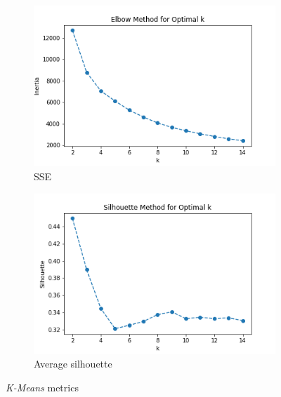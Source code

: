 \begin{figure}[h!]
     \captionsetup{justification=centering}		
     \centering
     \begin{subfigure}{0.49\textwidth}
         \centering
	 \captionsetup{type=figure}
         \includegraphics[width=\textwidth]{img/clustering/sse.png}
         \caption{SSE}
         \label{fig:sse_img}
     \end{subfigure}
     \begin{subfigure}{0.49\textwidth}
         \centering
         \includegraphics[width=\textwidth]{img/clustering/sil.png}
         \caption{Average silhouette}
         \label{fig:sil_img}
     \end{subfigure}
     \caption{\emph{K-Means} metrics}
    \label{fig:km_metrics}
\end{figure}

